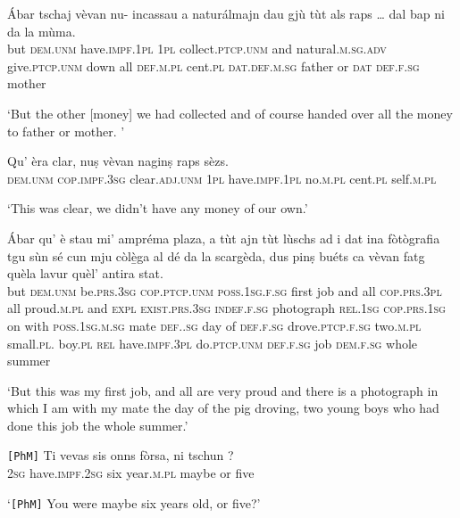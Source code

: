 \begin{linenumbers}
	\gll    Ábar tschaj vèvan nu- incassau a naturálmajn dau gjù tùt als raps … dal bap ni da la mùma.\\
	but \textsc{dem.unm} have.\textsc{impf.1pl} \textsc{1pl} collect.\textsc{ptcp.unm} and natural.\textsc{m.sg.adv}  give.\textsc{ptcp.unm} down all \textsc{def.m.pl} cent.\textsc{pl} {} \textsc{dat.def.m.sg} father or  \textsc{dat}  \textsc{def.f.sg} mother \\
\end{linenumbers}
\medskip
\glt `But the other [money] we had collected and of course handed over all the money to father or mother. '
\medskip

\begin{linenumbers}
	\gll    Qu’ èra clar, nuṣ vèvan naginṣ raps sèzs.\\
	\textsc{dem.unm} \textsc{cop.impf.3sg} clear.\textsc{adj.unm} \textsc{1pl} have.\textsc{impf.1pl}  no.\textsc{m.pl} cent.\textsc{pl} self.\textsc{m.pl}\\
\end{linenumbers}
\medskip
\glt `This was clear, we didn’t have any money of our own.'
\medskip


\begin{linenumbers}
	\gll    Ábar qu’ è stau mi’ ampréma plaza, a tùt ajn tùt lùschs ad i dat ina fòtògrafia tgu sùn sé cun mju còlè̱ga al dé da la scargèda, dus pinṣ buéts ca vèvan fatg quèla lavur quèl’ antira stat.\\
	but \textsc{dem.unm} be.\textsc{prs.3sg} \textsc{cop.ptcp.unm}  \textsc{poss.1sg.f.sg} first job and all \textsc{cop.prs.3pl} all proud.\textsc{m.pl} and  \textsc{expl} \textsc{exist.prs.3sg}  \textsc{indef.f.sg} photograph \textsc{rel.1sg}  \textsc{cop.prs.1sg} on with \textsc{poss.1sg.m.sg} mate \textsc{def..sg} day of  \textsc{def.f.sg}  drove.\textsc{ptcp.f.sg} two.\textsc{m.pl} small.\textsc{pl.} boy.\textsc{pl} \textsc{rel} have.\textsc{impf.3pl} do.\textsc{ptcp.unm} \textsc{def.f.sg} job \textsc{dem.f.sg} whole summer\\
\end{linenumbers}
\medskip
\glt `But this was my first job, and all are very proud and there is a photograph in which I am with my mate the day of the pig droving, two young boys who had done this job the whole summer.'
\medskip

\begin{linenumbers}
	\gll  \texttt{[PhM]} Ti vevas sis onns fòrsa, ni tschun ?\\
{}	\textsc{2sg} have.\textsc{impf.2sg} six year.\textsc{m.pl} maybe or five \\
\end{linenumbers}
\medskip
\glt `\texttt{[PhM]} You were maybe six years old, or five?'
\medskip

